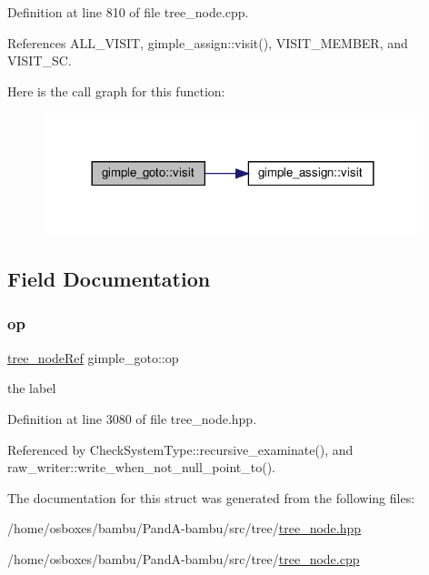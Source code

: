 Definition at line 810 of file tree\+\_\+node.\+cpp.



References A\+L\+L\+\_\+\+V\+I\+S\+IT, gimple\+\_\+assign\+::visit(), V\+I\+S\+I\+T\+\_\+\+M\+E\+M\+B\+ER, and V\+I\+S\+I\+T\+\_\+\+SC.

Here is the call graph for this function\+:
\nopagebreak
\begin{figure}[H]
\begin{center}
\leavevmode
\includegraphics[width=312pt]{d3/d77/structgimple__goto_a201fad3cf9302bdcd1c462b9d581d298_cgraph}
\end{center}
\end{figure}


\subsection{Field Documentation}
\mbox{\label{structgimple__goto_a8bf74a612541fe1691220fe73214eec3}} 
\subsubsection{\texorpdfstring{op}{op}}
{\footnotesize\ttfamily \hyperlink{tree__node_8hpp_a6ee377554d1c4871ad66a337eaa67fd5}{tree\+\_\+node\+Ref} gimple\+\_\+goto\+::op}



the label 



Definition at line 3080 of file tree\+\_\+node.\+hpp.



Referenced by Check\+System\+Type\+::recursive\+\_\+examinate(), and raw\+\_\+writer\+::write\+\_\+when\+\_\+not\+\_\+null\+\_\+point\+\_\+to().



The documentation for this struct was generated from the following files\+:\begin{DoxyCompactItemize}
\item 
/home/osboxes/bambu/\+Pand\+A-\/bambu/src/tree/\hyperlink{tree__node_8hpp}{tree\+\_\+node.\+hpp}\item 
/home/osboxes/bambu/\+Pand\+A-\/bambu/src/tree/\hyperlink{tree__node_8cpp}{tree\+\_\+node.\+cpp}\end{DoxyCompactItemize}
